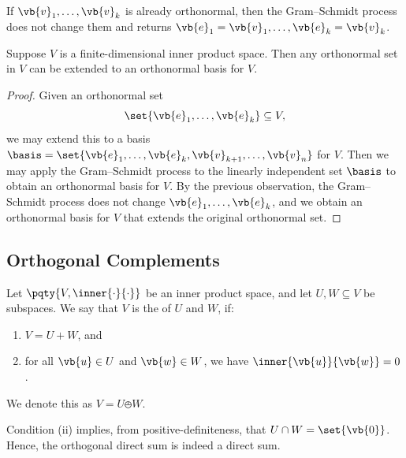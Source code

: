 \begin{remark}
    If \(\vb{v}_1, \ldots, \vb{v}_k\) is already orthonormal, then the Gram--Schmidt process does not change them and returns \(\vb{e}_1 = \vb{v}_1, \ldots, \vb{e}_k = \vb{v}_k\).
\end{remark}

\begin{corollary}
    Suppose \(V\) is a finite-dimensional inner product space. Then any orthonormal set in \(V\) can be extended to an orthonormal basis for \(V\).
\end{corollary}

\begin{proof}
    Given an orthonormal set
    \[
        \set{\vb{e}_1, \ldots, \vb{e}_k} \subseteq V,
    \]
    we may extend this to a basis \(\basis = \set{\vb{e}_1, \ldots, \vb{e}_k, \vb{v}_{k + 1}, \ldots, \vb{v}_n}\) for \(V\). Then we may apply the Gram--Schmidt process to the linearly independent set \(\basis\) to obtain an orthonormal basis for \(V\). By the previous observation, the Gram--Schmidt process does not change \(\vb{e}_1, \ldots, \vb{e}_k\), and we obtain an orthonormal basis for \(V\) that extends the original orthonormal set.
\end{proof}

\subsection{Orthogonal Complements}

\begin{definition}
    Let \(\pqty{V, \inner{\cdot}{\cdot}}\) be an inner product space, and let \(U, W \subseteq V\) be subspaces. We say that \(V\) is the  of \(U\) and \(W\), if:
    \begin{enumerate}[label=(\roman*)]
        \item \(V = U + W\), and
        \item for all \(\vb{u} \in U\) and \(\vb{w} \in W\), we have \(\inner{\vb{u}}{\vb{w}} = 0\).
    \end{enumerate}

    We denote this as \(V = U \obot W\).
\end{definition}

\begin{remark}
    Condition (ii) implies, from positive-definiteness, that \(U \cap W = \set{\vb{0}}\). Hence, the orthogonal direct sum is indeed a direct sum.
\end{remark}

